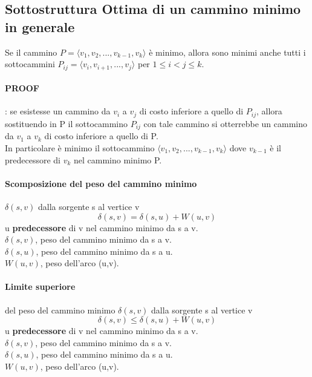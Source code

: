 \subsection{Sottostruttura Ottima di un cammino minimo in generale}
Se il cammino $P = \langle v_1,v_2,..., v_{k-1}, v_k \rangle$ è minimo, allora sono minimi
anche tutti i sottocammini $P_{ij} = \langle v_i, v_{i+1}, ..., v_j \rangle$ per $1 \leq i < j \leq k$.
\paragraph*{PROOF}: se esistesse un cammino da $v_i$ a $v_j$ di costo inferiore a quello di $P_{ij}$,
allora sostituendo in P il sottocammino $P_{ij}$ con tale cammino si otterrebbe un
cammino da $v_1$ a $v_k$ di costo inferiore a quello di P.\\
In particolare è minimo il sottocammino $\langle v_1,v_2,..., v_{k-1}, v_k \rangle$ dove
$v_{k-1}$ è il predecessore di $v_k$ nel cammino minimo P.
\paragraph*{Scomposizione del peso del cammino minimo} $\delta(s,v)$ dalla sorgente s al vertice v
\[ \delta(s,v) = \delta(s,u)+W(u,v) \]
u \textbf{predecessore} di v nel cammino minimo da s a v.\\
$\delta(s,v)$, peso del cammino minimo da s a v.\\
$\delta(s,u)$, peso del cammino minimo da s a u.\\
$W(u,v)$, peso dell'arco (u,v).
\paragraph*{Limite superiore} del peso del cammino minimo $\delta(s,v)$ dalla sorgente s al vertice v
\[ \delta(s,v) \leq \delta(s,u) + W(u,v) \]
u \textbf{predecessore} di v nel cammino minimo da s a v.\\
$\delta(s,v)$, peso del cammino minimo da s a v.\\
$\delta(s,u)$, peso del cammino minimo da s a u.\\
$W(u,v)$, peso dell'arco (u,v).
